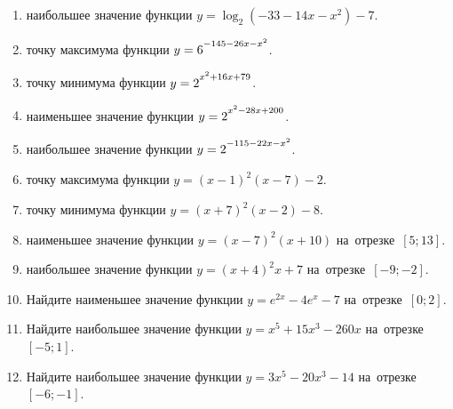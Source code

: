 \documentclass[a4paper,10pt]{article}
\begin{document}
\begin{enumerate}
\item {} наибольшее значение функции $y=\log_2\left(-33-14x-x^2\right)-7$.

\item {} точку максимума функции $y=6\strut^{-145-26x-x^2}$.

\item {} точку минимума функции $y=2\strut^{x^2+16x+79}$.

\item {} наименьшее значение функции $y=2\strut^{x^2-28x+200}$.

\item {} наибольшее значение функции $y=2\strut^{-115-22x-x^2}$.

\item {} точку максимума функции $y=\left(x-1\right)^2\left(x-7\right)-2$.

\item {} точку минимума функции $y=\left(x+7\right)^2\left(x-2\right)-8$.

\item {} наименьшее значение функции $y=\left(x-7\right)^2\left(x+10\right)$ на~отрезке~$\left[5;13\right]$.

\item {} наибольшее значение функции $y=\left(x+4\right)^2x+7$ на~отрезке~$\left[-9;-2\right]$.

\item Найдите наименьшее значение функции $y=e^{2x}-4e^x-7$ на~отрезке~$\left[0;2\right]$.

\item Найдите наибольшее значение функции $y=x^5+15x^3-260x$ на~отрезке~$\left[-5;1\right]$.

\item Найдите наибольшее значение функции $y=3x^5-20x^3-14$ на~отрезке~$\left[-6;-1\right]$.

\end{enumerate}
\end{document}

